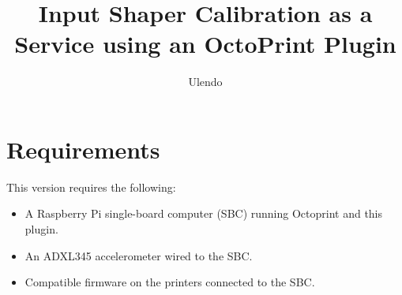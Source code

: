 \documentclass[12pt]{article}
\title{Input Shaper Calibration as a Service using an OctoPrint Plugin}
\author{Ulendo}
\date{\vspace{-5ex}} %
\begin{document}
\maketitle

\section{Requirements}
This version requires the following:
\begin{itemize}
	\item A Raspberry Pi single-board computer (SBC) running Octoprint and this plugin.
	\item An ADXL345 accelerometer wired to the SBC.
	\item Compatible firmware on the printers connected to the SBC.
\end{itemize}
\end{document}
